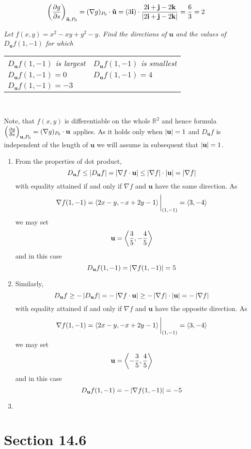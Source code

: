 \documentclass[8pt]{article} %
\begin{document}
\begin{description}
{		\[\left(\frac{\partial g}{\partial s}\right)_{\mathbf{\tilde{u}},P_0}=(\nabla g)_{P_0}\cdot\mathbf{\tilde{u}}=
		\left(3\mathbf{i}\right)\cdot\frac{{2\mathbf{i}+\mathbf{j}-2\mathbf{k}}}{\left|2\mathbf{i}+\mathbf{j}-2\mathbf{k}\right|}
		=\frac{6}{3}=2\]
		}
	\item[\# 29.]{{\it Let $f(x,y)=x^2-xy+y^2-y$. Find the directions of $\mathbf{u}$ and the values of $D_{\mathbf{u}}f(1,-1)$
		for which}
		\begin{inparaenum}[\bfseries a.]
			\setlength{\tabcolsep}{15pt}
			\begin{tabular}{ll}
		\item {\it $D_{\mathbf{u}}f(1,-1)$ is largest}
		&\item {\it $D_{\mathbf{u}}f(1,-1)$ is smallest}\\
		\item {\it $D_{\mathbf{u}}f(1,-1)=0$}
		&\item {\it $D_{\mathbf{u}}f(1,-1)=4$}\\
		\item {\it $D_{\mathbf{u}}f(1,-1)=-3$}\\
		\end{tabular}
		\end{inparaenum}\\
		}
		Note, that $f(x,y)$ is differentiable on the whole $\mathbb{R}^2$ and hence formula
		$\left(\frac{\partial g}{\partial s}\right)_{\mathbf{u},P_0}=(\nabla g)_{P_0}\cdot\mathbf{u}$ applies. As it holds only
		when $\left|\mathbf{u}\right|=1$ and 
		$D_{\mathbf{u}}f$ is independent of the length of $\mathbf{u}$ we will assume in subsequent that $\left|\mathbf{u}\right|
		=1$.
		\begin{enumerate}[\bfseries a.]
			\item From the properties of dot product,
				\[D_{\mathbf{u}}f\leq\left|D_{\mathbf{u}}f\right|=\left|\nabla f\cdot\mathbf{u}\right|\leq
				\left|\nabla f\right|\cdot\left|\mathbf{u}\right|=\left|\nabla f\right|\]
				with equality attained if and only if $\nabla f$ and $\mathbf{u}$ have the same direction. As
				\[\nabla f(1,-1)=\left<2x-y,-x+2y-1\right>\bigg|_{(1,-1)}=\left<3,-4\right>\]
				we may set \[\mathbf{u}=\left<\frac{3}{5},-\frac{4}{5}\right>\]
				and in this case
				\[D_{\mathbf{u}}f(1,-1)=\left|\nabla f(1,-1)\right|=5\]
			\item Similarly,
				\[D_{\mathbf{u}}f\geq-\left|D_{\mathbf{u}}f\right|=-\left|\nabla f\cdot\mathbf{u}\right|\geq-\left|\nabla f\right|
				\cdot\left|\mathbf{u}\right|=-\left|\nabla{f}\right|\]
				with equality attained if and only if $\nabla f$ and $\mathbf{u}$ have the opposite direction. As
				\[\nabla f(1,-1)=\left<2x-y,-x+2y-1\right>\bigg|_{(1,-1)}=\left<3,-4\right>\]
				we may set \[\mathbf{u}=\left<-\frac{3}{5},\frac{4}{5}\right>\]
				and in this case
				\[D_{\mathbf{u}}f(1,-1)=-\left|\nabla f(1,-1)\right|=-5\]
			\item 
		\end{enumerate}
\section{Section 14.6}
\end{description}
\end{document}
